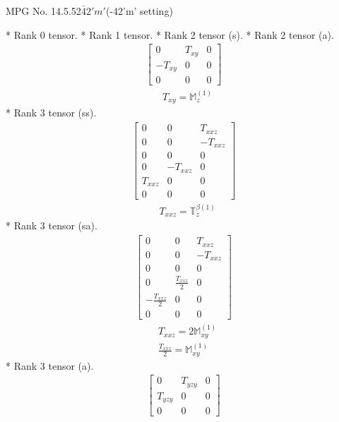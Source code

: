 \documentclass[fleqn,8pt,landscape]{jsarticle}
\begin{document}
\setcounter{MaxMatrixCols}{32}

\renewcommand{\tablename}{Table~}
\renewcommand{\figurename}{Figure~}
\begin{center}
\LARGE
MPG No. 14.5.52\quad$\bar{4}2'm'$\quad(-42'm' setting)
\end{center}
* Rank 0 tensor.
* Rank 1 tensor.
* Rank 2 tensor (s).
* Rank 2 tensor (a).
\begin{align*}
\begin{bmatrix} 0 & T_{xy} & 0 \\ - T_{xy} & 0 & 0 \\ 0 & 0 & 0 \end{bmatrix}
\end{align*}
\begin{align*}
& T_{xy} = \mathbb{M}_{z}^{(1)}
\end{align*}
* Rank 3 tensor (ss).
\begin{align*}
\begin{bmatrix} 0 & 0 & T_{xxz} \\ 0 & 0 & - T_{xxz} \\ 0 & 0 & 0 \\ 0 & - T_{xxz} & 0 \\ T_{xxz} & 0 & 0 \\ 0 & 0 & 0 \end{bmatrix}
\end{align*}
\begin{align*}
& T_{xxz} = \mathbb{T}_{z}^{\beta(1)}
\end{align*}
* Rank 3 tensor (sa).
\begin{align*}
\begin{bmatrix} 0 & 0 & T_{xxz} \\ 0 & 0 & - T_{xxz} \\ 0 & 0 & 0 \\ 0 & \frac{T_{xxz}}{2} & 0 \\ - \frac{T_{xxz}}{2} & 0 & 0 \\ 0 & 0 & 0 \end{bmatrix}
\end{align*}
\begin{align*}
& T_{xxz} = 2 \mathbb{M}_{xy}^{(1)} \\
& \frac{T_{xxz}}{2} = \mathbb{M}_{xy}^{(1)}
\end{align*}
* Rank 3 tensor (a).
\begin{align*}
\begin{bmatrix} 0 & T_{yzy} & 0 \\ T_{yzy} & 0 & 0 \\ 0 & 0 & 0 \end{bmatrix}
\end{align*}
\end{document}
